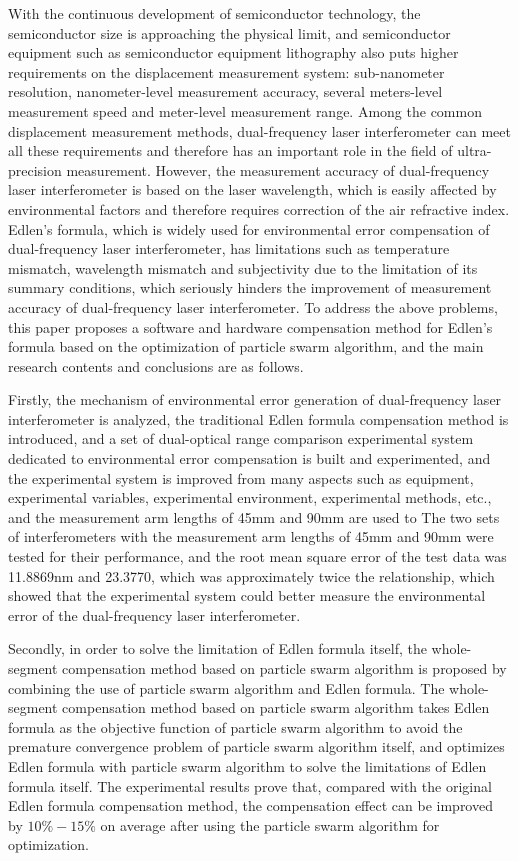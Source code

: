 \begin{abstract*}
  With the continuous development of semiconductor technology, the semiconductor size is approaching the physical limit, and semiconductor equipment such as semiconductor equipment lithography also puts higher requirements on the displacement measurement system: sub-nanometer resolution, nanometer-level measurement accuracy, several meters-level measurement speed and meter-level measurement range. Among the common displacement measurement methods, dual-frequency laser interferometer can meet all these requirements and therefore has an important role in the field of ultra-precision measurement. However, the measurement accuracy of dual-frequency laser interferometer is based on the laser wavelength, which is easily affected by environmental factors and therefore requires correction of the air refractive index. Edlen's formula, which is widely used for environmental error compensation of dual-frequency laser interferometer, has limitations such as temperature mismatch, wavelength mismatch and subjectivity due to the limitation of its summary conditions, which seriously hinders the improvement of measurement accuracy of dual-frequency laser interferometer. To address the above problems, this paper proposes a software and hardware compensation method for Edlen's formula based on the optimization of particle swarm algorithm, and the main research contents and conclusions are as follows.

  Firstly, the mechanism of environmental error generation of dual-frequency laser interferometer is analyzed, the traditional Edlen formula compensation method is introduced, and a set of dual-optical range comparison experimental system dedicated to environmental error compensation is built and experimented, and the experimental system is improved from many aspects such as equipment, experimental variables, experimental environment, experimental methods, etc., and the measurement arm lengths of 45mm and 90mm are used to The two sets of interferometers with the measurement arm lengths of 45mm and 90mm were tested for their performance, and the root mean square error of the test data was 11.8869nm and 23.3770, which was approximately twice the relationship, which showed that the experimental system could better measure the environmental error of the dual-frequency laser interferometer.

  Secondly, in order to solve the limitation of Edlen formula itself, the whole-segment compensation method based on particle swarm algorithm is proposed by combining the use of particle swarm algorithm and Edlen formula. The whole-segment compensation method based on particle swarm algorithm takes Edlen formula as the objective function of particle swarm algorithm to avoid the premature convergence problem of particle swarm algorithm itself, and optimizes Edlen formula with particle swarm algorithm to solve the limitations of Edlen formula itself. The experimental results prove that, compared with the original Edlen formula compensation method, the compensation effect can be improved by $10\%-15\%$ on average after using the particle swarm algorithm for optimization.


\end{abstract*}
